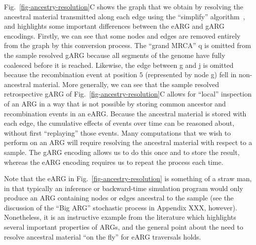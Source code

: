 \documentclass{article}
\newcommand{\noderef}[1]{\textsf{#1}}
\begin{document}
Fig.~\ref{fig-ancestry-resolution}C shows the graph that we obtain
by resolving the ancestral material transmitted along each edge
using the ``simplify'' algorithm~\citep{kelleher2018efficient},
and highlights some important
differences between the eARG and gARG encodings.
Firstly, we can see that some nodes and edges are removed entirely
from the graph by this conversion process.
The ``grand MRCA'' \noderef{q} is omitted from the
sample resolved gARG because all segments of the genome have
fully coalesced before it is reached. Likewise, the edge
between \noderef{g} and \noderef{j} is omitted because the recombination
event at position $5$ (represented by node \noderef{g})
fell in non-ancestral material.
More generally, we can see that the sample resolved
retrospective gARG of Fig.~\ref{fig-ancestry-resolution}C
allows for ``local'' inspection
of an ARG in a way that is not possible by storing
common ancestor and recombination events in an eARG. Because
the ancestral material is stored with each edge, the
cumulative effects of events over time can be reasoned
about, without first ``replaying'' those events. Many computations
that we wish to perform on an ARG will require resolving
the ancestral material with respect to a sample.
The gARG encoding
allows us to do this once and to store the result, whereas
the eARG encoding requires us to repeat the process
each time.

Note that the \citet{wiuf1999recombination} eARG
in Fig.~\ref{fig-ancestry-resolution} is something of a straw man,
in that typically an inference or backward-time simulation program would only produce an
ARG containing
nodes or edges ancestral to the sample
(see the discussion of the ``Big ARG'' stochastic process in Appendix XXX,
however). Nonetheless, it
is an instructive example from the literature which highlights several
important properties of ARGs, and the general point about
the need to resolve ancestral material ``on the fly'' for eARG traversals
holds.
\end{document}
